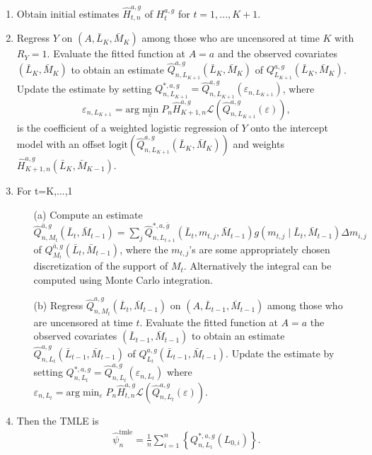 \documentclass[AMA,STIX1COL]{WileyNJD-v2}
\begin{document}
\begin{enumerate}
      \item Obtain initial estimates $\hat{H}_{t, n}^{a, g}$ of $H_t^{a,g}$ for $t=1,...,K+1$.
     \item Regress $Y$ on $(A, \bar{L}_K, \bar{M}_K)$ among those who are uncensored at time $K$ with $R_Y=1$. Evaluate the fitted function at $A=a$ and the observed covariates $(\bar{L}_K, \bar{M}_{K})$ to obtain an estimate $\hat{Q}^{a, g}_{n, L_{K+1}}(\bar{L}_K, \bar{M}_{K})$ of $Q^{a, g}_{L_{K+1}}(\bar{L}_K, \bar{M}_{K})$. Update the estimate by setting $Q^{*,a,g}_{n, L_{K+1}}=\hat{Q}^{a, g}_{n, L_{K+1}}(\varepsilon_{n, L_{K+1}})$, where 
    $$\varepsilon_{n, L_{K+1}} = \text{arg}\min_{\varepsilon} P_n \hat{H}^{a, g}_{K+1, n} \mathcal{L} \left( \hat{Q}^{a, g}_{n, L_{K+1}}(\varepsilon)\right),$$
    is the coefficient of a weighted logistic regression of $Y$ onto the intercept model with an offset $\text{logit}\left(\hat{Q}^{a, g}_{n, L_{K+1}}(\bar{L}_K, \bar{M}_{K}) \right)$ and weights $\hat{H}^{a, g}_{K+1, n}(\bar{L}_K, \bar{M}_{K-1})$.
    \item For t=K,...,1
    \begin{itemize}
        \item[(a)]  Compute an estimate $\hat{Q}^{\bar{a}, g}_{n, M_t}(\bar{L}_t, \bar{M}_{t-1})=\sum_j \hat{Q}^{*,a, \bar{g}}_{n, L_{t+1}}( \bar{L}_t, m_{t,j}, \bar{M}_{t-1})g(m_{t,j} \mid \bar{L}_t, \bar{M}_{t-1})\Delta m_{i,j}$ of $Q^{\bar{a}, g}_{M_t}(\bar{L}_t, \bar{M}_{t-1})$, where the $m_{t,j}$'s are some appropriately chosen discretization of the support of $M_t$. Alternatively the integral can be computed using Monte Carlo integration.
        \item[(b)] Regress $\hat{Q}^{a, g}_{n, M_t}(\bar{L}_t, \bar{M}_{t-1})$ on $(A, \bar{L}_{t-1}, \bar{M}_{t-1})$ among those who are uncensored at time $t$. Evaluate the fitted function at $A=a$ the observed covariates $(\bar{L}_{t-1}, \bar{M}_{t-1})$ to obtain an estimate $\hat{Q}^{a, g}_{n, L_t}(\bar{L}_{t-1}, \bar{M}_{t-1})$ of $Q^{a, g}_{L_t}(\bar{L}_{t-1}, \bar{M}_{t-1})$. Update the estimate by setting $Q_{n, L_t}^{*, a, g}=\hat{Q}^{a, g}_{n, L_t}(\varepsilon_{n,L_t})$ where $\varepsilon_{n,L_t}=\text{arg}\min_{\varepsilon} P_n \hat{H}^{a, g}_{t, n} \mathcal{L} \left( \hat{Q}^{a,g}_{n, L_{t}}(\varepsilon)\right)$.
    \end{itemize}
    \item Then the TMLE is 
    \begin{align}
        \label{eq:tmle}
        \hat{\psi}_n^{\text{tmle}}=\frac{1}{n}\sum_{i=1}^n \left\{ Q^{*,a, g}_{n, L_1}(L_{0,i})\right\}.
    \end{align}
\end{enumerate}
\end{document}
